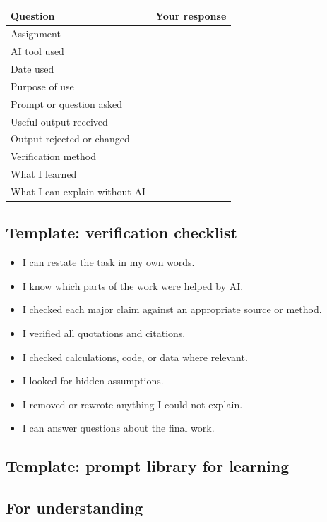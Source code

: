 \documentclass{SIAMbook2023}
\begin{document}
\begin{longtable}{p{}p{}}
\toprule
\textbf{Question} & \textbf{Your response} \\
\midrule
Assignment & \\
AI tool used & \\
Date used & \\
Purpose of use & \\
Prompt or question asked & \\
Useful output received & \\
Output rejected or changed & \\
Verification method & \\
What I learned & \\
What I can explain without AI & \\
\bottomrule
\end{longtable}

\clearpage
\subsection{Template: verification checklist}
\label{app:verification-checklist}

\begin{itemize}[label=$\square$]
\item I can restate the task in my own words.
\item I know which parts of the work were helped by AI.
\item I checked each major claim against an appropriate source or method.
\item I verified all quotations and citations.
\item I checked calculations, code, or data where relevant.
\item I looked for hidden assumptions.
\item I removed or rewrote anything I could not explain.
\item I can answer questions about the final work.
\end{itemize}

\subsection{Template: prompt library for learning}
\label{app:prompt-library}

\subsection*{For understanding}
\end{document}
